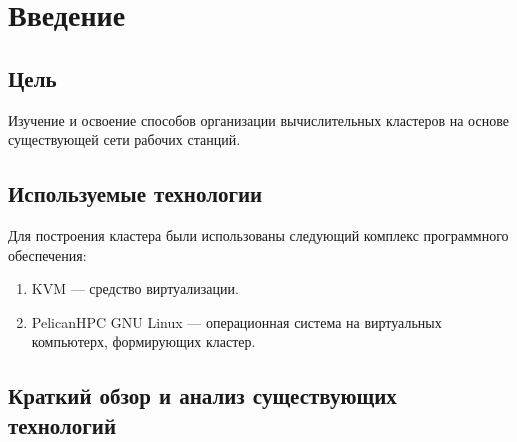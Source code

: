 \chapter{Введение}

\section{Цель}

Изучение и освоение способов организации вычислительных кластеров на основе существующей сети рабочих станций.

\section{Используемые технологии}
Для построения кластера были использованы следующий комплекс программного обеспечения:

\begin{enumerate}
  \item KVM --- средство виртуализации.
  \item PelicanHPC GNU Linux --- операционная система на виртуальных компьютерх, формирующих кластер.
\end{enumerate}

\section{Краткий обзор и анализ существующих технологий}

